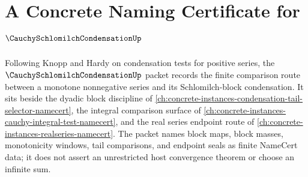 \chapter{A Concrete Naming Certificate for $\CauchySchlomilchCondensationUp$}
\label{ch:concrete-instances-cauchy-schlomilch-condensation-namecert}

Following Knopp and Hardy on condensation tests for positive series, the $\CauchySchlomilchCondensationUp$ packet records the finite comparison route between a monotone nonnegative series and its Schlomilch-block condensation. It sits beside the dyadic block discipline of \autoref{ch:concrete-instances-condensation-tail-selector-namecert}, the integral comparison surface of \autoref{ch:concrete-instances-cauchy-integral-test-namecert}, and the real series endpoint route of \autoref{ch:concrete-instances-realseries-namecert}. The packet names block maps, block masses, monotonicity windows, tail comparisons, and endpoint seals as finite NameCert data; it does not assert an unrestricted host convergence theorem or choose an infinite sum.

